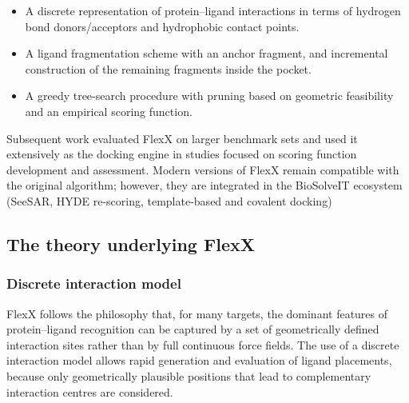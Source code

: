 \documentclass[12pt]{article}
\begin{document}
\begin{itemize}
  \item A discrete representation of protein--ligand interactions in terms of hydrogen bond donors/acceptors and hydrophobic contact points.
  \item A ligand fragmentation scheme with an anchor fragment, and incremental construction of the remaining fragments inside the pocket.
  \item A greedy tree-search procedure with pruning based on geometric feasibility and an empirical scoring function.
\end{itemize}

Subsequent work evaluated FlexX on larger benchmark sets\cite{CH7_kramer1999} and used it extensively as the docking engine in studies focused on scoring function development and assessment\cite{CH7_stahl,CH7_bissantz2000}. Modern versions of FlexX remain compatible with the original algorithm; however, they are integrated in the BioSolveIT ecosystem (SeeSAR, HYDE re-scoring, template-based and covalent docking)

\subsection{The theory underlying FlexX}

\subsubsection{Discrete interaction model}

FlexX follows the philosophy that, for many targets, the dominant features of protein--ligand recognition can be captured by a set of geometrically defined interaction sites rather than by full continuous force fields\cite{CH7_rarey1996,CH7_bohm1994}. The use of a discrete interaction model allows rapid generation and evaluation of ligand placements, because only geometrically plausible positions that lead to complementary interaction centres are considered.
\end{document}
